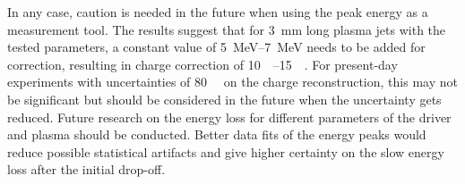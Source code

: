 \documentclass[bachelor_thesis]{subfiles}
\begin{document}
In any case, caution is needed in the future when using the peak energy as a measurement tool. The results suggest that for \qty{3}{\mm} long plasma jets with the tested parameters, a constant value of \qtyrange{5}{7}{\MeV} needs to be added for correction, resulting in charge correction of \qtyrange{10}{15}{\pico \C}.
For present-day experiments with uncertainties of \qty{80}{\pico \C} \cite{Schoebel2022} on the charge reconstruction, this may not be significant but should be considered in the future when the uncertainty gets reduced. 
Future research on the energy loss for different parameters of the driver and plasma should be conducted. Better data fits of the energy peaks would reduce possible statistical artifacts and give higher certainty on the slow energy loss after the initial drop-off.
\end{document}
